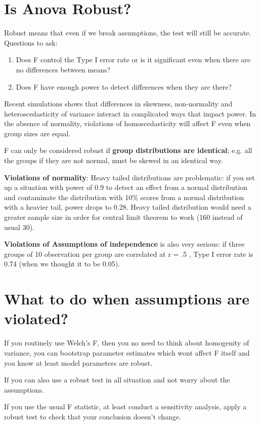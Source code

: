 \section{Is Anova Robust?}
Robust means that even if we break assumptions, the test will still be accurate.
Questions to ask:
\begin{enumerate}
\item Does F control the Type I error rate or is it significant even when there are no differences between means?
\item Does F have enough power to detect differences when they are there?
\end{enumerate}

Recent simulations shows that differences in skewness, non-normality and heteroscedasticity of variance interact in complicated ways that impact power. In the absence of normality, violations of homoscedasticity will affect F even when group sizes are equal. 

F can only be considered robust if \textbf{group distributions are identical}; e.g. all the groups if they are not normal, must be skewed in an identical way. 

\textbf{Violations of normality}: Heavy tailed distributions are problematic: if you set up a situation with power of 0.9 to detect an effect from a normal distribution and contaminate the distribution with 10\% scores from a normal distribution with a heavier tail, power drops to 0.28.  Heavy tailed distribution would need a greater sample size in order for central limit theorem to work (160 instead of usual 30).

\textbf{Violations of Assumptions of independence} is also very serious: if three groups of 10 observation per group are correlated at r = .5 , Type I error rate is 0.74 (when we thought it to be 0.05).

\section{What to do when assumptions are violated?}
If you routinely use Welch's F, then you no need to think about homogenity of variance, you can bootstrap parameter estimates which wont affect F itself and you know at least model parameters are robust.

If you can also use a robust test in all situation and not worry about the assumptions.

If you use the usual F statistic, at least conduct a sensitivity analysis, apply a robust test to check that your conclusion doesn't change. 

